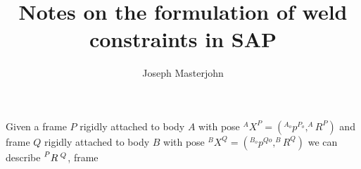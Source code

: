 \documentclass[12pt]{article}
\title{Notes on the formulation of weld constraints in SAP}
\author{Joseph Masterjohn}
\begin{document}
\maketitle

\section*{}
Given a frame $P$ rigidly attached to body $A$ with pose
$^AX^P = (^{A_o}p^{P_o}, ^AR^P)$ and frame $Q$ rigidly attached to body $B$ with
pose $^BX^Q = (^{B_o}p^{Qo}, ^BR^Q)$ we can describe $\prescript{P}{}{R}^{\;Q}$, frame 
\end{document}
